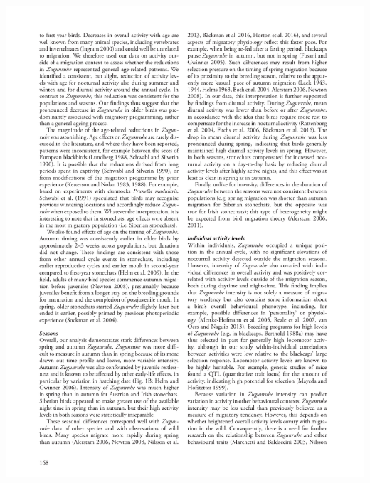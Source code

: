 \documentclass[a4paper, twoside]{templates/ociamthesis}
\begin{document}
\begin{center}\includegraphics[width=1\linewidth]{pdf_chapters/zug/zug_crop_Part14} \end{center}
\end{document}
